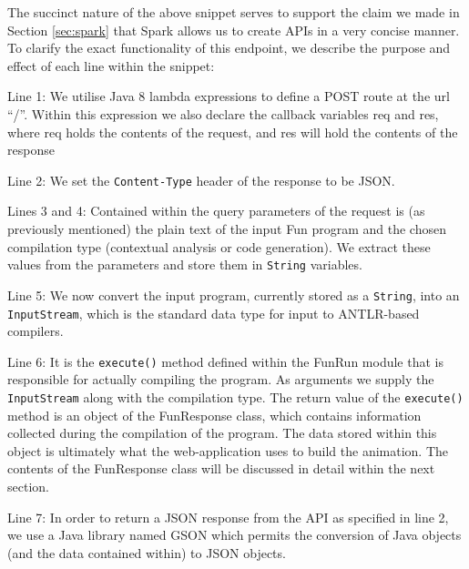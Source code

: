 \documentclass{l4proj}
\begin{document}
The succinct nature of the above snippet serves to support the claim we made in Section \ref{sec:spark} that Spark allows us to create APIs in a very concise manner. To clarify the exact functionality of this endpoint, we describe the purpose and effect of each line within the snippet:
\begin{description}
\item Line 1: We utilise Java 8 lambda expressions to define a POST route at the url ``/''. Within this expression we also declare the callback variables req and res, where req holds the contents of the request, and res will hold the contents of the response
\item Line 2: We set the \texttt{Content-Type} header of the response to be JSON.
\item Lines 3 and 4: Contained within the query parameters of the request is (as previously mentioned) the plain text of the input Fun program and the chosen compilation type (contextual analysis or code generation). We extract these values from the parameters and store them in \texttt{String} variables.
\item Line 5: We now convert the input program, currently stored as a \texttt{String}, into an \texttt{InputStream}, which is the standard data type for input to ANTLR-based compilers.
\item Line 6: It is the \texttt{execute()} method defined within the FunRun module that is responsible for actually compiling the program. As arguments we supply the \texttt{InputStream} along with the compilation type. The return value of the \texttt{execute()} method is an object of the FunResponse class, which contains information collected during the compilation of the program. The data stored within this object is ultimately what the web-application uses to build the animation. The contents of the FunResponse class will be discussed in detail within the next section.
\item Line 7: In order to return a JSON response from the API as specified in line 2, we use a Java library named GSON which permits the conversion of Java objects (and the data contained within) to JSON objects.
\end{description}
\end{document}
